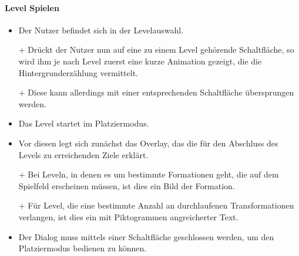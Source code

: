 \paragraph{Level Spielen}\mbox{}\newline
\begin{itemize}
\item Der Nutzer befindet sich in der Levelauswahl.
\item[+] Drückt der Nutzer nun auf eine zu einem
Level gehörende Schaltfläche, so wird ihm je nach Level zuerst eine kurze
Animation gezeigt, die die Hintergrunderzählung vermittelt. 
\item[+] Diese kann allerdings mit einer entsprechenden Schaltfläche übersprungen werden.
\item Das Level startet im Platziermodus.
\item Vor diesen legt sich zunächst das Overlay, das die für den Abschluss des Levels zu erreichenden Ziele
erklärt.
\item[+] Bei Leveln, in denen es um bestimmte Formationen geht, die auf
dem Spielfeld erscheinen müssen, ist dies ein Bild der Formation.
\item[+] Für Level, die eine bestimmte Anzahl an durchlaufenen Transformationen
verlangen, ist dies ein mit Piktogrammen angreicherter Text.
\item Der Dialog muss mittels einer Schaltfläche geschlossen werden, um den
Platziermodus bedienen zu können. 
\end{itemize}


